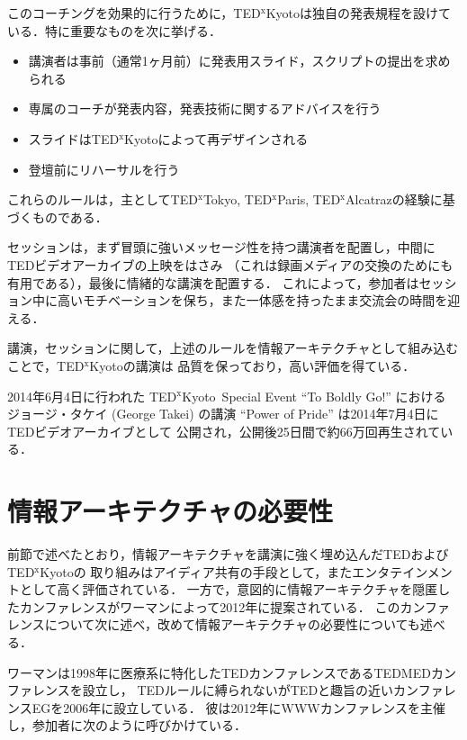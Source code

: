 \documentclass[submit,techreq,jkeyword,noauthor]{ipsj}
\newcommand{\TED}{\textrm{TED}}
\newcommand{\TEDMED}{\textrm{TEDMED}}
\newcommand{\TEDx}{\TED${}^{\textrm{x}}$}
\newcommand{\TEDxTokyo}{\TEDx\textrm{Tokyo}}
\newcommand{\TEDxKyoto}{\TEDx\-\textrm{Kyoto}}
\newcommand{\TEDxParis}{\TEDx\textrm{Paris}}
\newcommand{\TEDxAlcatraz}{\TEDx\textrm{Alcatraz}}
\begin{document}
このコーチングを効果的に行うために，\TEDxKyoto は独自の発表規程を設けている．特に重要なものを次に挙げる．
\begin{itemize}
\item 講演者は事前（通常1ヶ月前）に発表用スライド，スクリプトの提出を求められる
\item 専属のコーチが発表内容，発表技術に関するアドバイスを行う
\item スライドは\TEDxKyoto によって再デザインされる
\item 登壇前にリハーサルを行う
\end{itemize}
これらのルールは，主として\TEDxTokyo, \TEDxParis, \TEDxAlcatraz の経験に基づくものである．

セッションは，まず冒頭に強いメッセージ性を持つ講演者を配置し，中間に\TED ビデオアーカイブの上映をはさみ
（これは録画メディアの交換のためにも有用である），最後に情緒的な講演を配置する．
これによって，参加者はセッション中に高いモチベーションを保ち，また一体感を持ったまま交流会の時間を迎える．

講演，セッションに関して，上述のルールを情報アーキテクチャとして組み込むことで，\TEDxKyoto の講演は
品質を保っており，高い評価を得ている．\cite{ml,gr}

2014年6月4日に行われた \TEDxKyoto\ Special Event ``To Boldly Go!'' における
ジョージ・タケイ (George Takei) の講演 ``Power of Pride'' は2014年7月4日に\TED ビデオアーカイブとして
公開され，公開後25日間で約66万回再生されている．\cite{gt}



\section{情報アーキテクチャの必要性}

前節で述べたとおり，情報アーキテクチャを講演に強く埋め込んだ\TED および\TEDxKyoto の
取り組みはアイディア共有の手段として，またエンタテインメントとして高く評価されている．
一方で，意図的に情報アーキテクチャを隠匿したカンファレンスがワーマンによって2012年に提案されている．
このカンファレンスについて次に述べ，改めて情報アーキテクチャの必要性についても述べる．

ワーマンは1998年に医療系に特化した\TED カンファレンスである\TEDMED カンファレンスを設立し，
\TED ルールに縛られないが\TED と趣旨の近いカンファレンスEGを2006年に設立している．
彼は2012年にWWWカンファレンスを主催し，参加者に次のように呼びかけている．\cite{wwwweb}
\end{document}
